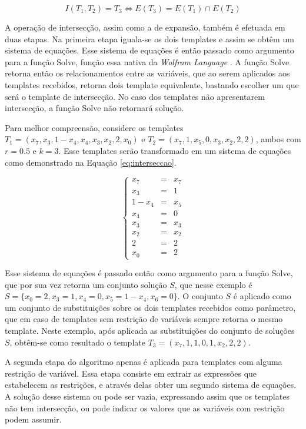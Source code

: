 \begin{equation}
I(T_1,T_2)=T_3 \Leftrightarrow E(T_3) = E(T_1) \cap E(T_2)
\end{equation}

A operação de intersecção, assim como a de expansão, também é efetuada em duas etapas. Na primeira etapa iguala-se os dois templates e assim se obtêm um sistema de equações. Esse sistema de equações é então passado como argumento para a função Solve, função essa nativa da \textit{Wolfram Language} \cite{woframMathematica10}. A função Solve retorna então os relacionamentos entre as variáveis, que ao serem aplicados aos templates recebidos, retorna dois template equivalente, bastando escolher um que será o template de intersecção. No caso dos templates não apresentarem intersecção, a função Solve não retornará solução.

Para melhor compreensão, considere os templates $T_1 = (x_7,x_3,1-x_4,x_4,x_3,x_2,2,x_0)$ e $T_2 = (x_7,1,x_5,0,x_3,x_2,2,2)$, ambos com $r=0.5$ e $k=3$. Esse templates serão transformado em um sistema de equações como demonstrado na Equação \ref{eq:interseccao}.

\begin{equation}
\left\{\begin{matrix}
x_7   & = & x_7 \\ 
x_3   & = & 1 \\ 
1-x_4 & = & x_5    \\ 
x_4   & = & 0    \\ 
x_3   & = & x_3    \\ 
x_2   & = & x_2   \\ 
2     & = & 2   \\ 
x_0   & = & 2
\end{matrix}\right.
\label{eq:interseccao}
\end{equation}

Esse sistema de equações é passado então como argumento para a função Solve, que por sua vez retorna um conjunto solução $S$, que nesse exemplo é $S = \{x_0 = 2, x_3 = 1, x_4 = 0, x_5 = 1 - x_4, x_6 = 0\}$. O conjunto $S$ é aplicado como um conjunto de substituições sobre os dois templates recebidos como parâmetro, que em caso de templates sem restrição de variáveis sempre retorna o mesmo template. Neste exemplo, após aplicada as substituições do conjunto de soluções $S$, obtêm-se como resultado o template $T_3 = (x_7, 1, 1, 0, 1, x_2, 2, 2)$.

A segunda etapa do algoritmo apenas é aplicada para templates com alguma restrição de variável. Essa etapa consiste em extrair as expressões que estabelecem as restrições, e através delas obter um segundo sistema de equações. A solução desse sistema ou pode ser vazia, expressando assim que os templates não tem intersecção, ou pode indicar os valores que as variáveis com restrição podem assumir.

